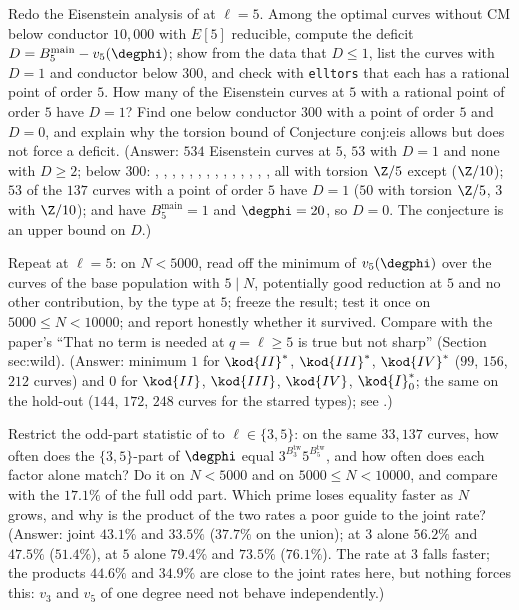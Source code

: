 \begin{sloppypar}
\begin{exercise}\label{exer:computation:eis}
Redo the Eisenstein analysis of  at $\ell=5$. Among the optimal curves without CM below conductor $10{,}000$ with $E[5]$ reducible,
compute the deficit $D=B^{\mathrm{main}}_5-v_5(\degphi)$; show from the data that $D\le1$, list the curves with $D=1$ and conductor below $300$, and check with
\texttt{elltors} that each has a rational point of order $5$. How many of the Eisenstein curves at $5$ with a rational point of order $5$ have $D=1$? Find one
below conductor $300$ with a point of order $5$ and $D=0$, and explain why the torsion bound of Conjecture conj:eis allows but does not force a deficit.
(Answer: $534$ Eisenstein curves at $5$, $53$ with $D=1$ and none with $D\ge2$; below $300$: , , , , ,
, , , , , , , , , all with torsion $\Z/5$ except
 ($\Z/10$); $53$ of the $137$ curves with a point of order $5$ have $D=1$ ($50$ with torsion $\Z/5$, $3$ with $\Z/10$);  and 
have $B^{\mathrm{main}}_5=1$ and $\degphi=20$, so $D=0$. The conjecture is an upper bound on $D$.)
\end{exercise}

\begin{exercise}[the protocol at $\ell=5$]\label{exer:computation:toy5}
Repeat  at $\ell=5$: on $N<5000$, read off the minimum of $v_5(\degphi)$ over the curves of the base population with $5\mid N$,
potentially good reduction at $5$ and no other contribution, by the type at $5$; freeze the result; test it once on $5000\le N<10000$; and report honestly
whether it survived. Compare with the paper's ``That no term is needed at $q=\ell\ge5$ is true but not sharp'' (Section sec:wild). (Answer: minimum $1$ for $\kod{II}^*$, $\kod{III}^*$, $\kod{IV}^*$ ($99$, $156$, $212$ curves) and
$0$ for $\kod{II}$, $\kod{III}$, $\kod{IV}$, $\kod{I}_0^*$; the same on the hold-out ($144$, $172$, $248$ curves for the starred types); see .)
\end{exercise}

\begin{exercise}\label{exer:computation:oddpart}
Restrict the odd-part statistic of  to $\ell\in\{3,5\}$: on the same $33{,}137$ curves, how often does the $\{3,5\}$-part of $\degphi$ equal
$3^{B^{\mathrm{tw}}_3}5^{B^{\mathrm{tw}}_5}$, and how often does each factor alone match? Do it on $N<5000$ and on $5000\le N<10000$, and compare with the $17.1\%$ of the full
odd part. Which prime loses equality faster as $N$ grows, and why is the product of the two rates a poor guide to the joint rate? (Answer: joint
$43.1\%$ and $33.5\%$ ($37.7\%$ on the union); at $3$ alone $56.2\%$ and $47.5\%$ ($51.4\%$), at $5$ alone $79.4\%$ and $73.5\%$ ($76.1\%$). The rate at $3$ falls faster;
the products $44.6\%$ and $34.9\%$ are close to the joint rates here, but nothing forces this: $v_3$ and $v_5$ of one degree need not behave independently.)
\end{exercise}


\end{sloppypar}
